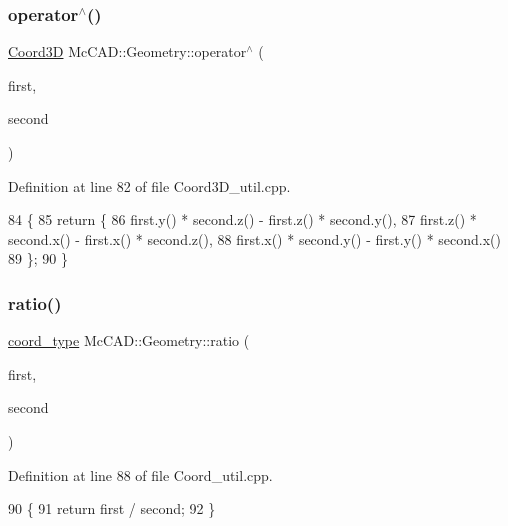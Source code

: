 \subsubsection{\texorpdfstring{operator$^\wedge$()}{operator^()}}
{\footnotesize\ttfamily \hyperlink{classMcCAD_1_1Geometry_1_1Coord3D}{Coord3D} Mc\+C\+A\+D\+::\+Geometry\+::operator$^\wedge$ (\begin{DoxyParamCaption}\item[{const \hyperlink{classMcCAD_1_1Geometry_1_1Coord3D}{Coord3D} \&}]{first,  }\item[{const \hyperlink{classMcCAD_1_1Geometry_1_1Coord3D}{Coord3D} \&}]{second }\end{DoxyParamCaption})}



Definition at line 82 of file Coord3\+D\+\_\+util.\+cpp.


\begin{DoxyCode}
84                               \{
85     \textcolor{keywordflow}{return} \{
86         first.y() * second.z() - first.z() * second.y(),
87         first.z() * second.x() - first.x() * second.z(),
88         first.x() * second.y() - first.y() * second.x()
89     \};
90 \}
\end{DoxyCode}
\mbox{\label{namespaceMcCAD_1_1Geometry_a9edef0077e899c04c5c006d1920c2a77}} 
\subsubsection{\texorpdfstring{ratio()}{ratio()}}
{\footnotesize\ttfamily \hyperlink{namespaceMcCAD_1_1Geometry_ac043b37a4a7e849fca22869e1982d2f8}{coord\+\_\+type} Mc\+C\+A\+D\+::\+Geometry\+::ratio (\begin{DoxyParamCaption}\item[{const \hyperlink{classMcCAD_1_1Geometry_1_1Coord}{Coord} \&}]{first,  }\item[{const \hyperlink{classMcCAD_1_1Geometry_1_1Coord}{Coord} \&}]{second }\end{DoxyParamCaption})}



Definition at line 88 of file Coord\+\_\+util.\+cpp.


\begin{DoxyCode}
90                             \{
91     \textcolor{keywordflow}{return} first / second;
92 \}
\end{DoxyCode}


